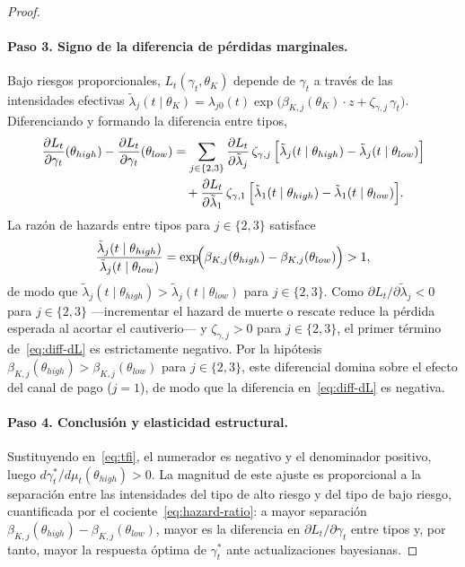 \documentclass[12pt]{article}
\theoremstyle{definition}
\theoremstyle{remark}
\newcommand{\1}{\mathbf{1}}
\begin{document}
\begin{proof}
\paragraph{Paso 3. Signo de la diferencia de pérdidas marginales.}
Bajo riesgos proporcionales, $L_t(\gamma_t,\theta_K)$ depende de $\gamma_t$ a
través de las intensidades efectivas
$\tilde{\lambda}_j(t\mid\theta_K)=\lambda_{j0}(t)
\exp\!\bigl(\beta_{K,j}(\theta_K)\cdot z+\zeta_{\gamma,j}\,\gamma_t\bigr)$.
Diferenciando y formando la diferencia entre tipos,
\begin{align}
\label{eq:diff-dL}
\frac{\partial L_t}{\partial\gamma_t}(\theta_{high})
-\frac{\partial L_t}{\partial\gamma_t}(\theta_{low})
&= \sum_{j\in\{2,3\}}\frac{\partial L_t}{\partial\tilde{\lambda}_j}\,
   \zeta_{\gamma,j}\,
   \Bigl[\tilde{\lambda}_j(t\mid\theta_{high})
         -\tilde{\lambda}_j(t\mid\theta_{low})\Bigr] \notag\\
&\quad
 + \frac{\partial L_t}{\partial\tilde{\lambda}_1}\,\zeta_{\gamma,1}\,
   \Bigl[\tilde{\lambda}_1(t\mid\theta_{high})
         -\tilde{\lambda}_1(t\mid\theta_{low})\Bigr].
\end{align}
La razón de hazards entre tipos para $j\in\{2,3\}$ satisface
\begin{equation}
\label{eq:hazard-ratio}
\frac{\tilde{\lambda}_j(t\mid\theta_{high})}
     {\tilde{\lambda}_j(t\mid\theta_{low})}
= \exp\!\Bigl(\beta_{K,j}(\theta_{high})-\beta_{K,j}(\theta_{low})\Bigr)
> 1,
\end{equation}
de modo que $\tilde{\lambda}_j(t\mid\theta_{high})>\tilde{\lambda}_j(t\mid\theta_{low})$
para $j\in\{2,3\}$. Como $\partial L_t/\partial\tilde{\lambda}_j<0$ para
$j\in\{2,3\}$ ---incrementar el hazard de muerte o rescate reduce la pérdida
esperada al acortar el cautiverio--- y $\zeta_{\gamma,j}>0$ para $j\in\{2,3\}$,
el primer término de~\eqref{eq:diff-dL} es estrictamente negativo. Por la hipótesis
$\beta_{K,j}(\theta_{high})>\beta_{K,j}(\theta_{low})$ para $j\in\{2,3\}$, este
diferencial domina sobre el efecto del canal de pago ($j=1$), de modo que la
diferencia en~\eqref{eq:diff-dL} es negativa.

\paragraph{Paso 4. Conclusión y elasticidad estructural.}
Sustituyendo en~\eqref{eq:tfi}, el numerador es negativo y el denominador
positivo, luego $d\gamma_t^\ast/d\mu_t(\theta_{high})>0$. La magnitud de este
ajuste es proporcional a la separación entre las intensidades del tipo de alto
riesgo y del tipo de bajo riesgo, cuantificada por el cociente~\eqref{eq:hazard-ratio}:
a mayor separación $\beta_{K,j}(\theta_{high})-\beta_{K,j}(\theta_{low})$, mayor
es la diferencia en $\partial L_t/\partial\gamma_t$ entre tipos y, por tanto,
mayor la respuesta óptima de $\gamma_t^\ast$ ante actualizaciones bayesianas.
\end{proof}
\end{document}
